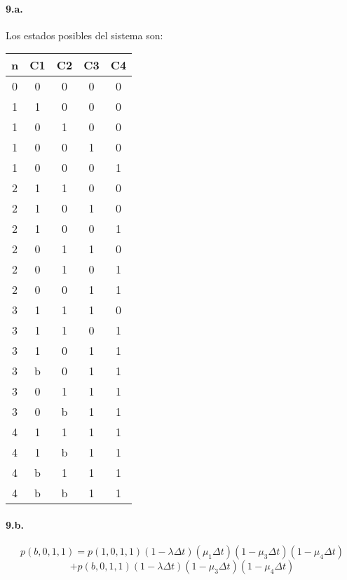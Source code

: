 \documentclass{article}
\begin{document}
   \paragraph{9.a.} Los estados posibles del sistema son:
   \begin{center}
   \begin{tabular}{|| c | c | c | c | c ||}
   \hline 
      n & C1 & C2 & C3 & C4 \\ \hline \hline
      0 & 0  & 0  & 0  & 0  \\ \hline \hline
      1 & 1  & 0  & 0  & 0  \\ \hline 
      1 & 0  & 1  & 0  & 0  \\ \hline
      1 & 0  & 0  & 1  & 0  \\ \hline
      1 & 0  & 0  & 0  & 1  \\ \hline \hline
      2 & 1  & 1  & 0  & 0  \\ \hline
      2 & 1  & 0  & 1  & 0  \\ \hline
      2 & 1  & 0  & 0  & 1  \\ \hline
      2 & 0  & 1  & 1  & 0  \\ \hline
      2 & 0  & 1  & 0  & 1  \\ \hline
      2 & 0  & 0  & 1  & 1  \\ \hline \hline
      3 & 1  & 1  & 1  & 0  \\ \hline
      3 & 1  & 1  & 0  & 1  \\ \hline
      3 & 1  & 0  & 1  & 1  \\ \hline
      3 & b  & 0  & 1  & 1  \\ \hline
      3 & 0  & 1  & 1  & 1  \\ \hline
      3 & 0  & b  & 1  & 1  \\ \hline \hline
      4 & 1  & 1  & 1  & 1  \\ \hline
      4 & 1  & b  & 1  & 1  \\ \hline
      4 & b  & 1  & 1  & 1  \\ \hline
      4 & b  & b  & 1  & 1  \\ \hline
   \end{tabular}
   \end{center}


   \paragraph{9.b.}
      $$p(b,0,1,1) = p(1,0,1,1) (1 - \lambda \Delta t) (\mu_1 \Delta t) (1 - \mu_3 \Delta t) (1 - \mu_4 \Delta t)$$
      $$           + p(b,0,1,1) (1 - \lambda \Delta t) (1 - \mu_3 \Delta t) (1 - \mu_4 \Delta t)$$
\end{document}
